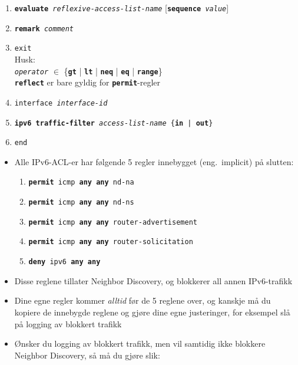 \begin{frame}[allowframebreaks]
\begin{enumerate}
  \item \texttt{\textbf{evaluate} \textit{reflexive-access-list-name}}
    [\texttt{\textbf{sequence}~\textit{value}}]
  \item \texttt{\textbf{remark} \textit{comment}}
  \item \texttt{exit}\\
    Husk:\\
    \texttt{\textit{operator}} \(\in\) \{\texttt{\textbf{gt}} |
    \texttt{\textbf{lt}} | \texttt{\textbf{neq}} |
    \texttt{\textbf{eq}} | \texttt{\textbf{range}}\}\\
    \texttt{\textbf{reflect}} er bare gyldig for \texttt{\textbf{permit}}-regler
  \framebreak
  \item \texttt{interface \textit{interface-id}}
  \item \texttt{\textbf{ipv6 traffic-filter} \textit{access-list-name} \{\textbf{in} | \textbf{out}\}}
  \item \texttt{end}
  \end{enumerate}
  \framebreak
  \begin{itemize}%
  \item Alle IPv6-ACL-er har følgende 5 regler innebygget
    (eng.~implicit) på slutten:
    \begin{enumerate}%
    \item \texttt{\textbf{permit} icmp \textbf{any} \textbf{any} nd-na}
    \item \texttt{\textbf{permit} icmp \textbf{any} \textbf{any} nd-ns}
    \item \texttt{\textbf{permit} icmp \textbf{any} \textbf{any} router-advertisement}
    \item \texttt{\textbf{permit} icmp \textbf{any} \textbf{any} router-solicitation}
    \item \texttt{\textbf{deny\phantom{it}} ipv6 \textbf{any} \textbf{any}}
    \end{enumerate}
  \item Disse reglene tillater Neighbor Discovery, og blokkerer all
    annen IPv6-trafikk
  \item Dine egne regler kommer \textit{alltid\/} før de 5 reglene
    over, og kanskje må du kopiere de innebygde reglene og gjøre dine
    egne justeringer, for eksempel slå på logging av blokkert trafikk
  \framebreak
  \item Ønsker du logging av blokkert trafikk, men vil samtidig ikke
    blokkere Neighbor Discovery, så må du gjøre slik:
    \begin{enumerate}

\end{enumerate}
\end{itemize}
\end{frame}
